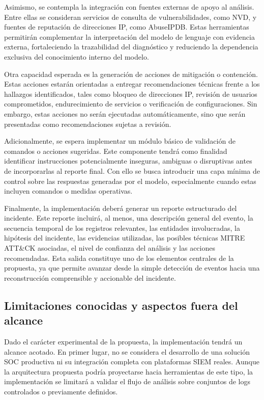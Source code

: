 Asimismo, se contempla la integración con fuentes externas de apoyo al análisis. Entre ellas se consideran servicios de consulta de vulnerabilidades, como NVD, y fuentes de reputación de direcciones IP, como AbuseIPDB. Estas herramientas permitirán complementar la interpretación del modelo de lenguaje con evidencia externa, fortaleciendo la trazabilidad del diagnóstico y reduciendo la dependencia exclusiva del conocimiento interno del modelo.

Otra capacidad esperada es la generación de acciones de mitigación o contención. Estas acciones estarán orientadas a entregar recomendaciones técnicas frente a los hallazgos identificados, tales como bloqueo de direcciones IP, revisión de usuarios comprometidos, endurecimiento de servicios o verificación de configuraciones. Sin embargo, estas acciones no serán ejecutadas automáticamente, sino que serán presentadas como recomendaciones sujetas a revisión.

Adicionalmente, se espera implementar un módulo básico de validación de comandos o acciones sugeridas. Este componente tendrá como finalidad identificar instrucciones potencialmente inseguras, ambiguas o disruptivas antes de incorporarlas al reporte final. Con ello se busca introducir una capa mínima de control sobre las respuestas generadas por el modelo, especialmente cuando estas incluyen comandos o medidas operativas.

Finalmente, la implementación deberá generar un reporte estructurado del incidente. Este reporte incluirá, al menos, una descripción general del evento, la secuencia temporal de los registros relevantes, las entidades involucradas, la hipótesis del incidente, las evidencias utilizadas, las posibles técnicas MITRE ATT\&CK asociadas, el nivel de confianza del análisis y las acciones recomendadas. Esta salida constituye uno de los elementos centrales de la propuesta, ya que permite avanzar desde la simple detección de eventos hacia una reconstrucción comprensible y accionable del incidente.

\subsection{Limitaciones conocidas y aspectos fuera del alcance}

Dado el carácter experimental de la propuesta, la implementación tendrá un alcance acotado. En primer lugar, no se considera el desarrollo de una solución SOC productiva ni su integración completa con plataformas SIEM reales. Aunque la arquitectura propuesta podría proyectarse hacia herramientas de este tipo, la implementación se limitará a validar el flujo de análisis sobre conjuntos de logs controlados o previamente definidos.

